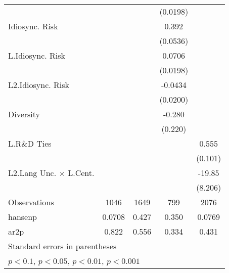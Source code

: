 {\begin{tabular}{l*{4}{c}}
                    &                     &                     &    (0.0198)         &                     \\
Idiosync. Risk      &                     &                     &       0.392\sym{***}&                     \\
                    &                     &                     &    (0.0536)         &                     \\
L.Idiosync. Risk    &                     &                     &      0.0706\sym{***}&                     \\
                    &                     &                     &    (0.0198)         &                     \\
L2.Idiosync. Risk   &                     &                     &     -0.0434\sym{*}  &                     \\
                    &                     &                     &    (0.0200)         &                     \\
Diversity           &                     &                     &      -0.280         &                     \\
                    &                     &                     &     (0.220)         &                     \\
L.R\&D Ties         &                     &                     &                     &       0.555\sym{***}\\
                    &                     &                     &                     &     (0.101)         \\
L2.Lang Unc. $\times$ L.Cent.&                     &                     &                     &      -19.85\sym{*}  \\
                    &                     &                     &                     &     (8.206)         \\
\hline
Observations        &        1046         &        1649         &         799         &        2076         \\
hansenp             &      0.0708         &       0.427         &       0.350         &      0.0769         \\
ar2p                &       0.822         &       0.556         &       0.334         &       0.431         \\
\hline\hline
\multicolumn{5}{l}{\footnotesize Standard errors in parentheses}\\
\multicolumn{5}{l}{\footnotesize \sym{+} \(p<0.1\), \sym{*} \(p<0.05\), \sym{**} \(p<0.01\), \sym{***} \(p<0.001\)}\\
\end{tabular}
}
